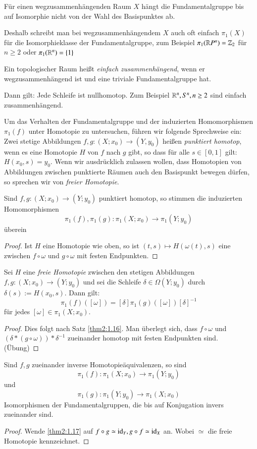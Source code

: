 \documentclass[a4paper,10pt]{scrartcl}
\begin{document}
\begin{kor}
 Für einen wegzusammenhängenden Raum $X$ hängt die Fundamentalgruppe bis auf Isomorphie nicht von der Wahl des Basispunktes ab.

Deshalb schreibt man bei wegzusammenhängendem $X$ auch oft einfach $\pi_1(X)$ für die Isomorphieklasse der Fundamentalgruppe, zum Beispiel $\pi_1(\mathbb{R} P^n)=\mathbb{Z}_2$ für $n\ge 2$ oder $\pi_1(\mathbb{R}^n)=\{1\}$
\end{kor}
\begin{df}
 Ein topologischer Raum heißt \emph{einfach zusammenhängend}, wenn er wegzusammenhängend ist und eine triviale Fundamentalgruppe hat.

Dann gilt: Jede Schleife ist nullhomotop. Zum Beispiel $\mathbb{R}^n, S^n, n\ge 2$ sind einfach zusammenhängend.  
\end{df}

Um das Verhalten der Fundamentalgruppe und der induzierten Homomorphismen $\pi_1(f)$ unter Homotopie zu untersuchen, führen wir folgende Sprechweise ein: Zwei stetige Abbildungen $f,g: (X;x_0)\to (Y,y_0)$ heißen \emph{punktiert homotop}, wenn es eine Homotopie $H$ von $f$ nach $g$ gibt, so dass für alle $s\in [0,1]$ gilt: $H(x_0, s)=y_0$. Wenn wir ausdrücklich zulassen wollen, dass Homotopien von Abbildungen zwischen punktierte Räumen auch den Basispunkt bewegen dürfen, so sprechen wir von \emph{freier Homotopie}.

\begin{st} \label{thm2:1.16}
 Sind $f,g: (X;x_0)\to (Y;y_0)$ punktiert homotop, so stimmen die induzierten Homomorphismen
\[
 \pi_1(f), \pi_1(g): \pi_1(X;x_0)\to \pi_1(Y;y_0)
\]
überein
\end{st}
\begin{proof}
 Ist $H$ eine Homotopie wie oben, so ist $(t,s)\mapsto H(\omega(t), s)$ eine zwischen $f\circ \omega$ und $g\circ \omega$ mit festen Endpunkten.
\end{proof}

\begin{st}\label{thm2:1.17}
 Sei $H$ eine \emph{freie Homotopie} zwischen den stetigen Abbildungen $f,g: (X;x_0)\to (Y;y_0)$ und sei die Schleife $\delta\in \Omega(Y;y_0)$ durch $\delta(s):=H(x_0, s)$. Dann gilt:
\[
 \pi_1(f)([\omega])=[\delta]\pi_1(g)([\omega]){[\delta]}^{-1}
\]
für jedes $[\omega]\in \pi_1(X;x_0)$.
\end{st}

\begin{proof}
 Dies folgt nach Satz \ref{thm2:1.16}. Man überlegt sich, dass $f\circ \omega$ und $(\delta*(g \circ \omega))*\delta^{-1}$ zueinander homotop mit festen Endpunkten sind. (Übung)
\end{proof}
\begin{kor}
 Sind $f,g$ zueinander inverse Homotopieäquivalenzen, so sind
\[
\pi_1(f):\pi_1(X;x_0)\to \pi_1(Y;y_0)
\]
und
\[
 \pi_1(g):\pi_1(Y;y_0)\to \pi_1(X;x_0)
\]
Isomorphismen der Fundamentalgruppen, die bis auf Konjugation invers zueinander sind. 
\end{kor}
\begin{proof}
 Wende \ref{thm2:1.17} auf $f\circ g \simeq \operatorname{id}_Y, g\circ f \simeq \operatorname{id}_X$ an.  Wobei $\simeq$ die freie Homotopie kennzeichnet.
\end{proof}
\end{document}
